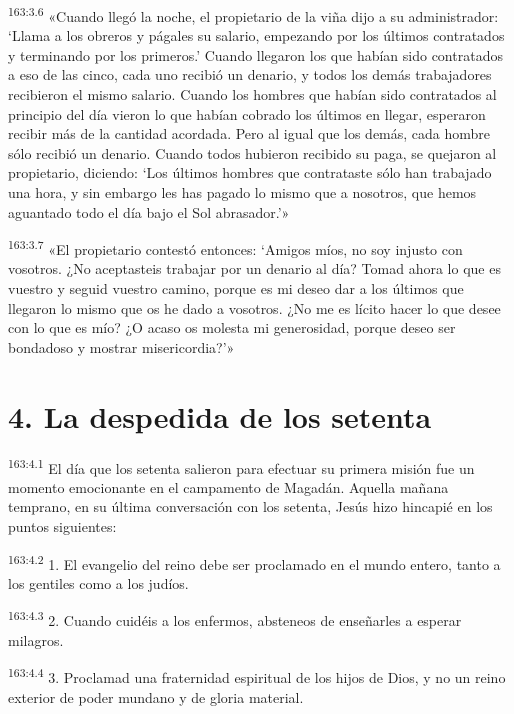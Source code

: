 \par 
\textsuperscript{163:3.6} «Cuando llegó la noche, el propietario de la viña dijo a su administrador: `Llama a los obreros y págales su salario, empezando por los últimos contratados y terminando por los primeros.' Cuando llegaron los que habían sido contratados a eso de las cinco, cada uno recibió un denario, y todos los demás trabajadores recibieron el mismo salario. Cuando los hombres que habían sido contratados al principio del día vieron lo que habían cobrado los últimos en llegar, esperaron recibir más de la cantidad acordada. Pero al igual que los demás, cada hombre sólo recibió un denario. Cuando todos hubieron recibido su paga, se quejaron al propietario, diciendo: `Los últimos hombres que contrataste sólo han trabajado una hora, y sin embargo les has pagado lo mismo que a nosotros, que hemos aguantado todo el día bajo el Sol abrasador.'»

\par 
\textsuperscript{163:3.7} «El propietario contestó entonces: `Amigos míos, no soy injusto con vosotros. ¿No aceptasteis trabajar por un denario al día? Tomad ahora lo que es vuestro y seguid vuestro camino, porque es mi deseo dar a los últimos que llegaron lo mismo que os he dado a vosotros. ¿No me es lícito hacer lo que desee con lo que es mío? ¿O acaso os molesta mi generosidad, porque deseo ser bondadoso y mostrar misericordia?'»

\section*{4. La despedida de los setenta}
\par 
\textsuperscript{163:4.1} El día que los setenta salieron para efectuar su primera misión fue un momento emocionante en el campamento de Magadán. Aquella mañana temprano, en su última conversación con los setenta, Jesús hizo hincapié en los puntos siguientes:

\par 
\textsuperscript{163:4.2} 1. El evangelio del reino debe ser proclamado en el mundo entero, tanto a los gentiles como a los judíos.

\par 
\textsuperscript{163:4.3} 2. Cuando cuidéis a los enfermos, absteneos de enseñarles a esperar milagros.

\par 
\textsuperscript{163:4.4} 3. Proclamad una fraternidad espiritual de los hijos de Dios, y no un reino exterior de poder mundano y de gloria material.

